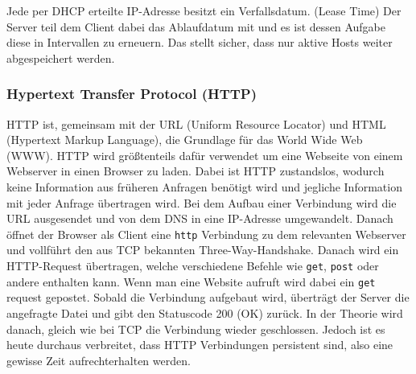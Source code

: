 \documentclass{article}
\begin{document}
	 Jede per DHCP erteilte IP-Adresse besitzt ein Verfallsdatum. (Lease Time) Der Server teil dem Client dabei das Ablaufdatum mit und es ist dessen Aufgabe diese in Intervallen zu erneuern. Das stellt sicher, dass nur aktive Hosts weiter abgespeichert werden.
	 \subsubsection{Hypertext Transfer Protocol (HTTP)}
	 HTTP ist, gemeinsam mit der URL (Uniform Resource Locator) und HTML (Hypertext Markup Language), die Grundlage für das World Wide Web (WWW). HTTP wird größtenteils dafür verwendet um eine Webseite von einem Webserver in einen Browser zu laden. Dabei ist HTTP zustandslos, wodurch keine Information aus früheren Anfragen benötigt wird und jegliche Information mit jeder Anfrage übertragen wird.
	 Bei dem Aufbau einer Verbindung wird die URL ausgesendet und von dem DNS in eine IP-Adresse umgewandelt. Danach öffnet der Browser als Client eine \verb|http| Verbindung zu dem relevanten Webserver und vollführt den aus TCP bekannten Three-Way-Handshake. Danach wird ein HTTP-Request übertragen, welche verschiedene Befehle wie \verb|get|, \verb|post| oder andere enthalten kann. Wenn man eine Website aufruft wird dabei ein \verb|get| request gepostet. Sobald die Verbindung aufgebaut wird, überträgt der Server die angefragte Datei und gibt den Statuscode 200 (OK) zurück. In der Theorie wird danach, gleich wie bei TCP die Verbindung wieder geschlossen. Jedoch ist es heute durchaus verbreitet, dass HTTP Verbindungen persistent sind, also eine gewisse Zeit aufrechterhalten werden.
\end{document}
